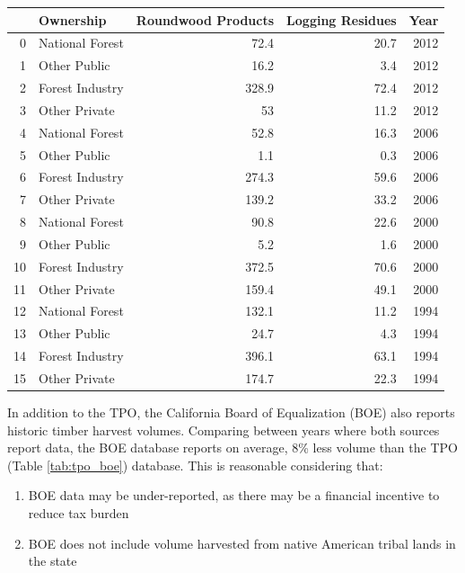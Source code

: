 \documentclass[a4paper]{article}
\begin{document}
\begin{center}
\begin{tabular}{rlrrr}
 & Ownership & Roundwood Products & Logging Residues & Year\\
\hline
0 & National Forest & 72.4 & 20.7 & 2012\\
1 & Other Public & 16.2 & 3.4 & 2012\\
2 & Forest Industry & 328.9 & 72.4 & 2012\\
3 & Other Private & 53 & 11.2 & 2012\\
4 & National Forest & 52.8 & 16.3 & 2006\\
5 & Other Public & 1.1 & 0.3 & 2006\\
6 & Forest Industry & 274.3 & 59.6 & 2006\\
7 & Other Private & 139.2 & 33.2 & 2006\\
8 & National Forest & 90.8 & 22.6 & 2000\\
9 & Other Public & 5.2 & 1.6 & 2000\\
10 & Forest Industry & 372.5 & 70.6 & 2000\\
11 & Other Private & 159.4 & 49.1 & 2000\\
12 & National Forest & 132.1 & 11.2 & 1994\\
13 & Other Public & 24.7 & 4.3 & 1994\\
14 & Forest Industry & 396.1 & 63.1 & 1994\\
15 & Other Private & 174.7 & 22.3 & 1994\\
\end{tabular}

\end{center}


In addition to the TPO, the California Board of Equalization (BOE) also
reports historic timber harvest volumes.  Comparing between years where both
sources report data, the BOE database reports on average, 8\% less volume than the TPO (Table \ref{tab:tpo_boe}) database. This is reasonable considering that:
\begin{enumerate}
\item BOE data may be under-reported, as there may be a financial incentive to reduce tax burden
\item BOE does not include volume harvested from native American tribal lands in the state
\end{enumerate}
\end{document}
